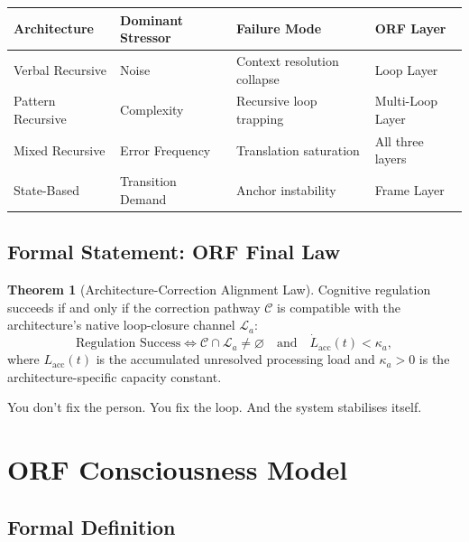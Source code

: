 \documentclass[12pt,a4paper]{article}
\theoremstyle{definition}
\newtheorem{theorem}{Theorem}[section]
\begin{document}
\begin{longtable}{@{}p{3.5cm}p{4cm}p{4cm}p{3cm}@{}}
  \toprule
  \textbf{Architecture} & \textbf{Dominant Stressor} &
  \textbf{Failure Mode} & \textbf{ORF Layer} \\
  \midrule
  Verbal Recursive & Noise & Context resolution collapse & Loop Layer \\
  Pattern Recursive & Complexity & Recursive loop trapping &
    Multi-Loop Layer \\
  Mixed Recursive & Error Frequency & Translation saturation &
    All three layers \\
  State-Based & Transition Demand & Anchor instability & Frame Layer \\
  \bottomrule
\end{longtable}

\subsection{Formal Statement: ORF Final Law}

\begin{theorem}[Architecture-Correction Alignment Law]
  Cognitive regulation succeeds if and only if the correction pathway
  $\mathcal{C}$ is compatible with the architecture's native
  loop-closure channel $\mathcal{L}_a$:
  \begin{equation}
    \text{Regulation Success} \Longleftrightarrow
    \mathcal{C} \cap \mathcal{L}_a \neq \varnothing
    \quad \text{and} \quad
    \dot{L}_\mathrm{acc}(t) < \kappa_a,
  \end{equation}
  where $L_\mathrm{acc}(t)$ is the accumulated unresolved processing load
  and $\kappa_a > 0$ is the architecture-specific capacity constant.
\end{theorem}

\begin{tcolorbox}[finding,title={Bottom Line (Ken's Final Law)}]
  You don't fix the person.  You fix the loop.
  And the system stabilises itself.
\end{tcolorbox}

\section{ORF Consciousness Model}

\subsection{Formal Definition}
\end{document}
